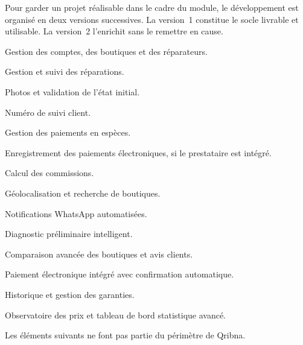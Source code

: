 \label{sec:perimetre}


Pour garder un projet réalisable dans le cadre du module, le développement est organisé en deux versions successives. La version~1 constitue le socle livrable et utilisable. La version~2 l’enrichit sans le remettre en cause.


\begin{cdcitems}
  \item Gestion des comptes, des boutiques et des réparateurs.
  \item Gestion et suivi des réparations.
  \item Photos et validation de l’état initial.
  \item Numéro de suivi client.
  \item Gestion des paiements en espèces.
  \item Enregistrement des paiements électroniques, si le prestataire est intégré.
  \item Calcul des commissions.
  \item Géolocalisation et recherche de boutiques.
\end{cdcitems}


\begin{cdcitems}
  \item Notifications WhatsApp automatisées.
  \item Diagnostic préliminaire intelligent.
  \item Comparaison avancée des boutiques et avis clients.
  \item Paiement électronique intégré avec confirmation automatique.
  \item Historique et gestion des garanties.
  \item Observatoire des prix et tableau de bord statistique avancé.
\end{cdcitems}


Les éléments suivants ne font pas partie du périmètre de Qribna.

